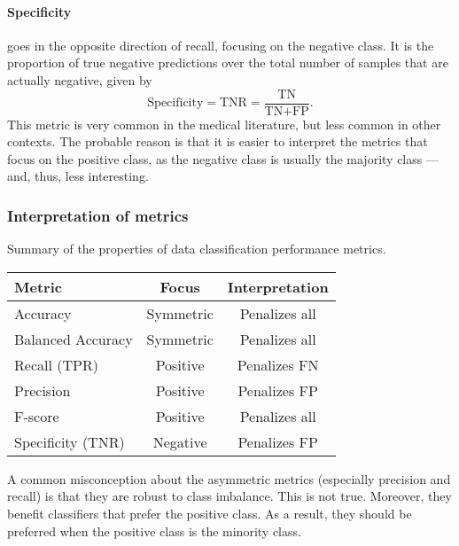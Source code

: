 \paragraph{Specificity} goes in the opposite direction of recall, focusing on the negative
class.  It is the proportion of true negative predictions over the total
number of samples that are actually negative, given by
\begin{equation*}
  \text{Specificity} = \text{TNR} = \frac{\text{TN}}{\text{TN} + \text{FP}}\text{.}
\end{equation*}
This metric is very common in the medical literature, but less common in other contexts.
The probable reason is that it is easier to interpret the metrics that focus on the
positive class, as the negative class is usually the majority class --- and, thus, less
interesting.

\subsubsection{Interpretation of metrics}

\begin{tablebox}[label=tab:classification-metrics]{Summary of the properties of
  data classification performance metrics.}
  \centering
  \begin{tabular}{l c c}
    \toprule
    \textbf{Metric} & \textbf{Focus} & \textbf{Interpretation} \\
    \midrule
    Accuracy           & Symmetric & Penalizes all \\
    Balanced Accuracy  & Symmetric & Penalizes all \\
    Recall (TPR)       & Positive & Penalizes FN \\
    Precision          & Positive & Penalizes FP \\
    F-score            & Positive & Penalizes all \\
    Specificity (TNR)  & Negative & Penalizes FP \\
    \bottomrule
  \end{tabular}
\end{tablebox}

A common misconception about the asymmetric metrics (especially precision and recall) is
that they are robust to class imbalance.  This is not true.  Moreover, they benefit
classifiers that prefer the positive class.  As a result, they should be preferred when
the positive class is the minority class.

